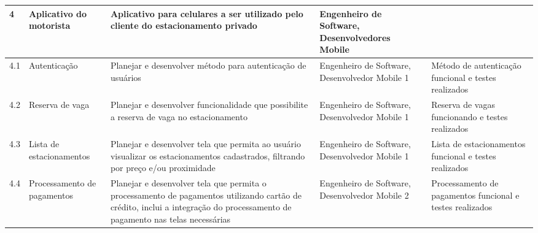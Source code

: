 \begin{landscape}
\begin{longtable}{@{\extracolsep{\fill}}  l  p{}  p{}  p{}  p{}  }
		\midrule
		4                      & Aplicativo do motorista                                  & Aplicativo para celulares a ser utilizado pelo cliente do estacionamento privado                                                                                                 & Engenheiro de Software, Desenvolvedores Mobile                                                   &                                                                                                          \\*
		\midrule
		4.1                    & Autenticação                                           & Planejar e desenvolver método para autenticação de usuários                                                                                                                  & Engenheiro de Software, Desenvolvedor Mobile 1                                                   & Método de autenticação funcional e testes realizados                                                  \\*
		\midrule
		4.2                    & Reserva de vaga                                          & Planejar e desenvolver funcionalidade que possibilite a reserva de vaga no estacionamento                                                                                        & Engenheiro de Software, Desenvolvedor Mobile 1                                                   & Reserva de vagas funcionando e testes realizados                                                         \\*
		\midrule
		4.3                    & Lista de estacionamentos                                 & Planejar e desenvolver tela que permita ao usuário visualizar os estacionamentos cadastrados, filtrando por preço e/ou proximidade                                             & Engenheiro de Software, Desenvolvedor Mobile 1                                                   & Lista de estacionamentos funcional e testes realizados                                                   \\*
		\midrule
		4.4                    & Processamento de pagamentos                              & Planejar e desenvolver tela que permita o processamento de pagamentos utilizando cartão de crédito, inclui a integração do processamento de pagamento nas telas necessárias & Engenheiro de Software, Desenvolvedor Mobile 2                                                   & Processamento de pagamentos funcional e testes realizados                                                \\*

\end{longtable}
\end{landscape}
